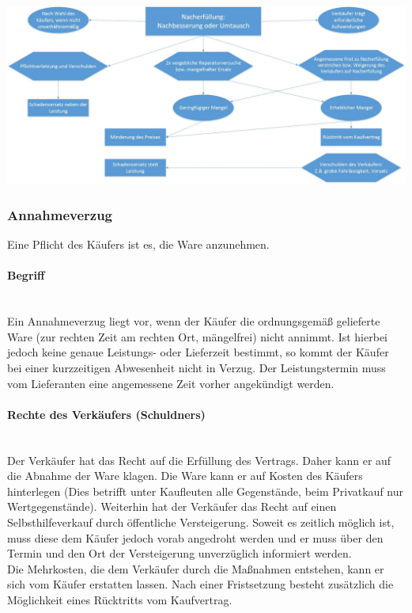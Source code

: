 		\includegraphics[scale=0.3]{pictures/lf01-pic/lf01-rechte_mangelhafte-leistung.jpg}\\
		
\subsubsection{Annahmeverzug}
Eine Pflicht des Käufers ist es, die Ware anzunehmen.\\
	\paragraph{Begriff}~\\Ein Annahmeverzug liegt vor, wenn der Käufer die ordnungsgemäß gelieferte Ware (zur rechten Zeit am rechten Ort, mängelfrei) nicht annimmt. Ist hierbei jedoch keine genaue Leistungs- oder Lieferzeit bestimmt, so kommt der Käufer bei einer kurzzeitigen Abwesenheit nicht in Verzug. Der Leistungstermin muss vom Lieferanten eine angemessene Zeit vorher angekündigt werden.
	\paragraph{Rechte des Verkäufers (Schuldners)}~\\Der Verkäufer hat das Recht auf die Erfüllung des Vertrags. Daher kann er auf die Abnahme der Ware klagen. Die Ware kann er auf Kosten des Käufers hinterlegen (Dies betrifft unter Kaufleuten alle Gegenstände, beim Privatkauf nur Wertgegenstände). Weiterhin hat der Verkäufer das Recht auf einen Selbsthilfeverkauf durch öffentliche Versteigerung. Soweit es zeitlich möglich ist, muss diese dem Käufer jedoch vorab angedroht werden und er muss über den Termin und den Ort der Versteigerung unverzüglich informiert werden. \\
Die Mehrkosten, die dem Verkäufer durch die Maßnahmen entstehen, kann er sich vom Käufer erstatten lassen. Nach einer Fristsetzung besteht zusätzlich die Möglichkeit eines Rücktritts vom Kaufvertrag.
